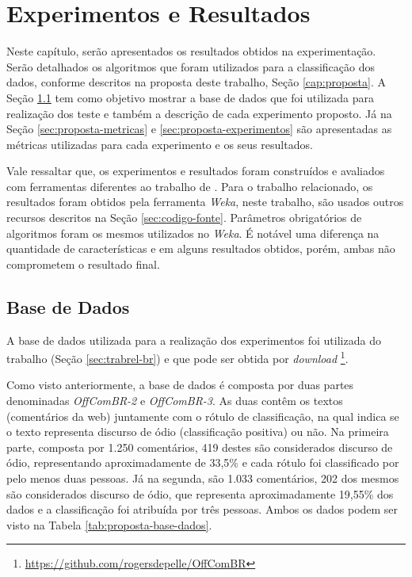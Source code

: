 \chapter{Experimentos e Resultados}

Neste capítulo, serão apresentados os resultados obtidos na experimentação. Serão detalhados os algoritmos que foram utilizados para a classificação dos dados, conforme descritos na proposta deste trabalho, Seção \ref{cap:proposta}. A Seção \ref{sec:proposta-base-dados} tem como objetivo mostrar a base de dados que foi utilizada para realização dos teste e também a descrição de cada experimento proposto. Já na Seção \ref{sec:proposta-metricas} e \ref{sec:proposta-experimentos} são apresentadas as métricas utilizadas para cada experimento e os seus resultados.  

Vale ressaltar que, os experimentos e resultados foram construídos e avaliados com ferramentas diferentes ao trabalho de \cite{Pelle2017}. Para o trabalho relacionado, os resultados foram obtidos pela ferramenta {\it Weka}, neste trabalho, são usados outros recursos descritos na Seção \ref{sec:codigo-fonte}. Parâmetros obrigatórios de algoritmos foram os mesmos utilizados no {\it Weka}. É notável uma diferença na quantidade de características e em alguns resultados obtidos, porém, ambas não comprometem o resultado final. 

\section{Base de Dados}\label{sec:proposta-base-dados}
A base de dados utilizada para a realização dos experimentos foi utilizada do trabalho  \cite{Pelle2017} (Seção \ref{sec:trabrel-br}) e que pode ser obtida por {\it download} \footnote{\url{https://github.com/rogersdepelle/OffComBR}}.

Como visto anteriormente, a base de dados é composta por duas partes denominadas {\it OffComBR-2} e {\it OffComBR-3}. As duas contêm os textos (comentários da web) juntamente com o rótulo de classificação, na qual indica se o texto representa discurso de ódio (classificação positiva) ou não. Na primeira parte, composta por 1.250 comentários, 419 destes são considerados discurso de ódio, representando aproximadamente de 33,5\% e cada rótulo foi classificado por pelo menos duas pessoas. Já na segunda, são 1.033 comentários, 202 dos mesmos são considerados discurso de ódio, que representa aproximadamente 19,55\% dos dados e a classificação foi atribuída por três pessoas. Ambos os dados podem ser visto na Tabela \ref{tab:proposta-base-dados}.

